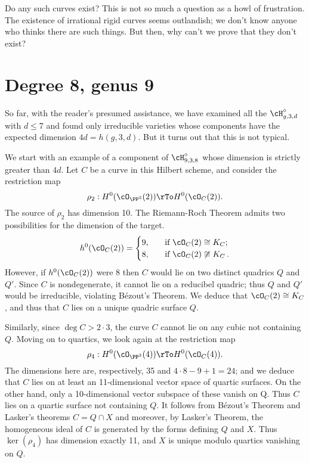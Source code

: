Do any such curves exist? This is not so much a question  as a howl of frustration. The existence of irrational rigid curves seems outlandish; we don't know anyone who thinks there are such things. But then, why can't we prove that they don't exist?



\section{Degree 8, genus 9}\label{degree 8 section}

So far, with the reader's presumed assistance, we have examined all the $\cH^\circ_{g,3,d}$ with $d\leq 7$
and found only irreducible varieties whose components have the expected dimension $4d = h(g,3,d)$. But it turns out that
this is not typical.

We start with an example of a component of $\cH^\circ_{9,3,8}$ whose dimension is strictly greater than $4d$.  Let $C$ be  a curve in this Hilbert scheme, and consider the restriction map
$$
\rho_2 : H^0(\cO_{\PP^3}(2)) \rTo H^0(\cO_C(2)).
$$
The source of $\rho_2$ has dimension 10. The Riemann-Roch Theorem admits two possibilities for the dimension
of the target.
\begin{align*}
h^0(\cO_C(2)) =
\begin{cases}
9, \quad &\text{if } \cO_C(2) \cong K_C; \\
8,  \quad &\text{if } \cO_C(2) \not\cong K_C\,.
\end{cases}
\end{align*}
However, if $h^0(\cO_C(2))$ were 8 then $C$ would  lie on two distinct quadrics $Q$ and $Q'$. Since $C$ is nondegenerate, it cannot lie on a reducibel quadric; thus $Q$ and $Q'$ would  be irreducible,  violating B\'ezout's Theorem. We deduce that $\cO_C(2) \cong K_C$, and thus that $C$ lies on a unique quadric surface $Q$.

Similarly, since $\deg C > 2\cdot 3$, the curve $C$ cannot lie on any cubic not containing $Q$. Moving on to quartics, we look again at the restriction map
$$
\rho_4 : H^0(\cO_{\PP^3}(4)) \rTo H^0(\cO_C(4)).
$$
The dimensions here are, respectively, 35 and $4\cdot 8 - 9 + 1 = 24$; and we deduce that $C$ lies on at least an 11-dimensional vector space of quartic surfaces. On the other hand, only a 10-dimensional vector subspace of these vanish on Q. Thus $C$ lies on a quartic surface not containing $Q$. It follows from B\'ezout's Theorem and 
Lasker's theorems  $C = Q \cap X$
and moreover, by Lasker's Theorem, the homogeneous ideal of $C$ is generated by the forms defining $Q$ and $X$. Thus $\ker(\rho_4)$ has dimension exactly 11, and  $X$ is unique modulo quartics vanishing on $Q$.

